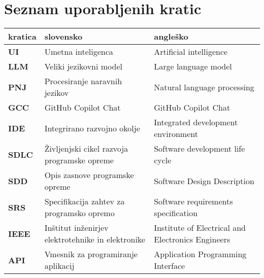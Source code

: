 \documentclass[a4paper,12pt,openright]{book}
\newcommand{\clearemptydoublepage}{\newpage{\pagestyle{empty}\cleardoublepage}}
\begin{document}
\vfill



\vspace{2cm}

\clearemptydoublepage
\pagestyle{empty}

\def\thepage{}%
\tableofcontents{}
\mainmatter 


\clearemptydoublepage


\chapter*{Seznam uporabljenih kratic}

\noindent\begin{tabular}{p{}|p{}|p{}}    %
  {\bf kratica} & {\bf slovensko}                              & {\bf angleško} \\ \hline
  {\bf UI}      & Umetna inteligenca               & Artificial intelligence \\
    {\bf LLM}      & Veliki jezikovni model            & Large language model \\
  {\bf PNJ} & Procesiranje naravnih jezikov & Natural language processing \\
  {\bf GCC}   & GitHub Copilot Chat              & GitHub Copilot Chat \\
  {\bf IDE}   & Integrirano razvojno okolje              & Integrated development environment \\
  {\bf SDLC}   & Življenjski cikel razvoja programske opreme              & Software development life cycle \\
  {\bf SDD}   & Opis zasnove programske opreme           & Software Design Description \\
  {\bf SRS}   & Specifikacija zahtev za programsko opremo& Software requirements specification \\
  {\bf IEEE}   & Inštitut inženirjev elektrotehnike in elektronike& Institute of Electrical and Electronics Engineers \\
  {\bf API}   & Vmesnik za programiranje aplikacij& Application Programming Interface \\

  
  



\end{tabular}
\end{document}
